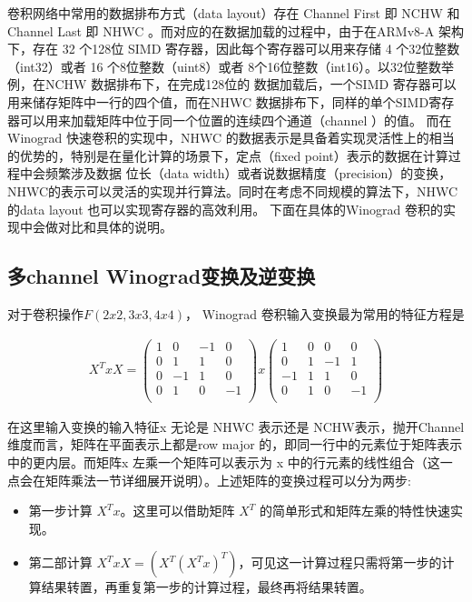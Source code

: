 卷积网络中常用的数据排布方式（data layout）存在 Channel First 即 NCHW 和 Channel Last 即 NHWC 。而对应的在数据加载的过程中，由于在ARMv8-A 架构下，存在 32 个128位
SIMD 寄存器，因此每个寄存器可以用来存储 4 个32位整数（int32）或者 16 个8位整数（uint8）或者 8个16位整数（int16）。以32位整数举例，在NCHW 数据排布下，在完成128位的
数据加载后，一个SIMD 寄存器可以用来储存矩阵中一行的四个值，而在NHWC 数据排布下，同样的单个SIMD寄存器可以用来加载矩阵中位于同一个位置的连续四个通道（channel ）的值。
而在Winograd 快速卷积的实现中，NHWC 的数据表示是具备着实现灵活性上的相当的优势的，特别是在量化计算的场景下，定点（fixed point）表示的数据在计算过程中会频繁涉及数据
位长（data width）或者说数据精度（precision）的变换，NHWC的表示可以灵活的实现并行算法。同时在考虑不同规模的算法下，NHWC的data layout 也可以实现寄存器的高效利用。
下面在具体的Winograd 卷积的实现中会做对比和具体的说明。

\subsection{多channel Winograd变换及逆变换}

对于卷积操作$F(2x2, 3x3, 4x4)$， Winograd 卷积输入变换最为常用的特征方程是

\begin{align}
  X^T x X = 
  \begin{pmatrix}
    1 & 0 & -1 & 0 \\
    0 & 1 & 1 & 0 \\
    0 & -1 & 1 & 0 \\
    0 & 1 & 0 & -1 \\
  \end{pmatrix}
  x
  \begin{pmatrix}
    1 & 0 & 0 & 0 \\
    0 & 1 & -1 & 1 \\
    -1 & 1 & 1 & 0 \\
    0 & 1 & 0 & -1 \\
  \end{pmatrix}
\end{align}

在这里输入变换的输入特征x 无论是 NHWC 表示还是 NCHW表示，抛开Channel 维度而言，矩阵在平面表示上都是row major 的，即同一行中的元素位于矩阵表示中的更内层。而矩阵x
左乘一个矩阵可以表示为 x 中的行元素的线性组合（这一点会在矩阵乘法一节详细展开说明）。上述矩阵的变换过程可以分为两步:

\begin{itemize}
\item 第一步计算 $X^T x $。这里可以借助矩阵 $X^T$ 的简单形式和矩阵左乘的特性快速实现。
\item 第二部计算 $X^T x X = (X^T(X^T x)^T)$，可见这一计算过程只需将第一步的计算结果转置，再重复第一步的计算过程，最终再将结果转置。
\end{itemize}

